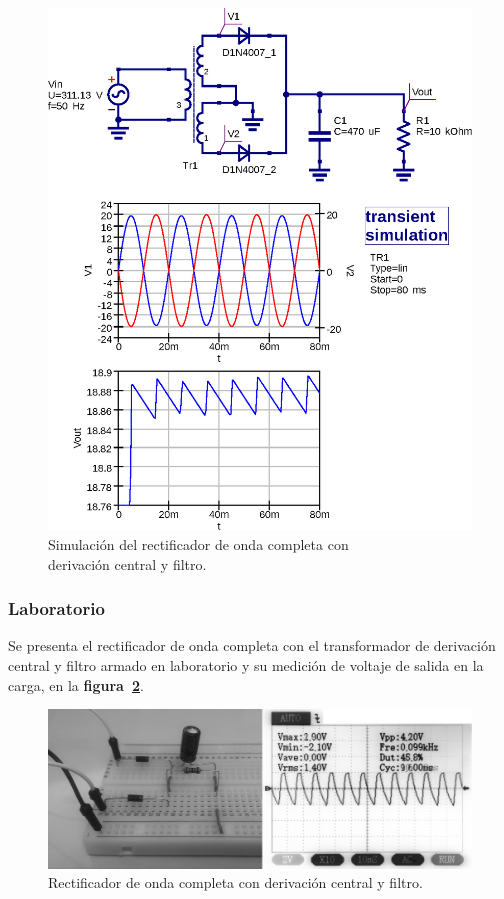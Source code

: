 \begin{figure}[!h]
\centering
\includegraphics[scale=0.75]{simulacion/06.derivacion_central2.eps}
\caption{Simulación del rectificador de onda completa con \\
derivación central y filtro.}
\label{simulacion06}
\end{figure}

\subsubsection{Laboratorio}
Se presenta el rectificador de onda completa con el transformador de derivación
central y filtro armado en laboratorio y su medición de voltaje de salida en la
carga, en la \textbf{figura~\ref{laboratorio08}}.

\begin{figure}[!h]
\centering
\includegraphics[scale=0.34]{fotos/06.derivacion_central2.eps}
\caption{Rectificador de onda completa con derivación central y filtro.}
\label{laboratorio08}
\end{figure}

